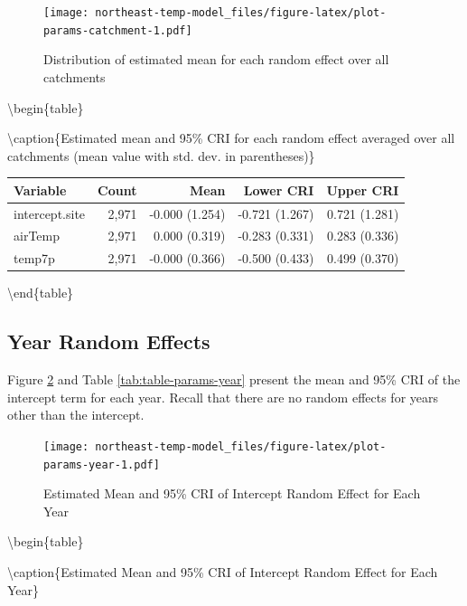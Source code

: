 \documentclass[
]{book}
\begin{document}
\begin{figure}
\centering
\texttt{[image: northeast-temp-model\_files/figure-latex/plot-params-catchment-1.pdf]}
\caption{\label{fig:plot-params-catchment}Distribution of estimated mean for each random effect over all catchments}
\end{figure}

\textbackslash begin\{table\}

\textbackslash caption\{\label{tab:table-params-catchment}Estimated mean and 95\% CRI for each random effect averaged over all catchments (mean value with std. dev. in parentheses)\}
\centering

\begin{tabular}[t]{l|r|r|r|r}
\hline
Variable & Count & Mean & Lower CRI & Upper CRI\\
\hline
intercept.site & 2,971 & -0.000 (1.254) & -0.721 (1.267) & 0.721 (1.281)\\
\hline
airTemp & 2,971 & 0.000 (0.319) & -0.283 (0.331) & 0.283 (0.336)\\
\hline
temp7p & 2,971 & -0.000 (0.366) & -0.500 (0.433) & 0.499 (0.370)\\
\hline
\end{tabular}

\textbackslash end\{table\}

\subsection{Year Random Effects}\label{year-random-effects-1}

Figure \ref{fig:plot-params-year} and Table \ref{tab:table-params-year} present the mean and 95\% CRI of the intercept term for each year. Recall that there are no random effects for years other than the intercept.

\begin{figure}
\centering
\texttt{[image: northeast-temp-model\_files/figure-latex/plot-params-year-1.pdf]}
\caption{\label{fig:plot-params-year}Estimated Mean and 95\% CRI of Intercept Random Effect for Each Year}
\end{figure}

\textbackslash begin\{table\}

\textbackslash caption\{\label{tab:table-params-year}Estimated Mean and 95\% CRI of Intercept Random Effect for Each Year\}
\centering
\end{document}
